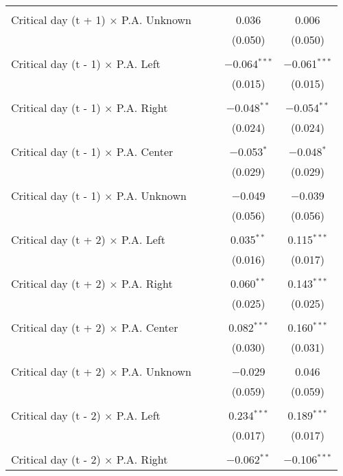 \documentclass[
]{article}
\begin{document}
\begin{table}[!htbp]
{\begin{tabular}{@{\extracolsep{5pt}}lcccc}
  & & & & \\ 
 Critical day (t + 1) $\times$ P.A. Unknown &  &  & 0.036 & 0.006 \\ 
  &  &  & (0.050) & (0.050) \\ 
  & & & & \\ 
 Critical day (t - 1) $\times$ P.A. Left &  &  & $-$0.064$^{***}$ & $-$0.061$^{***}$ \\ 
  &  &  & (0.015) & (0.015) \\ 
  & & & & \\ 
 Critical day (t - 1) $\times$ P.A. Right &  &  & $-$0.048$^{**}$ & $-$0.054$^{**}$ \\ 
  &  &  & (0.024) & (0.024) \\ 
  & & & & \\ 
 Critical day (t - 1) $\times$ P.A. Center &  &  & $-$0.053$^{*}$ & $-$0.048$^{*}$ \\ 
  &  &  & (0.029) & (0.029) \\ 
  & & & & \\ 
 Critical day (t - 1) $\times$ P.A. Unknown &  &  & $-$0.049 & $-$0.039 \\ 
  &  &  & (0.056) & (0.056) \\ 
  & & & & \\ 
 Critical day (t + 2) $\times$ P.A. Left &  &  & 0.035$^{**}$ & 0.115$^{***}$ \\ 
  &  &  & (0.016) & (0.017) \\ 
  & & & & \\ 
 Critical day (t + 2) $\times$ P.A. Right &  &  & 0.060$^{**}$ & 0.143$^{***}$ \\ 
  &  &  & (0.025) & (0.025) \\ 
  & & & & \\ 
 Critical day (t + 2) $\times$ P.A. Center &  &  & 0.082$^{***}$ & 0.160$^{***}$ \\ 
  &  &  & (0.030) & (0.031) \\ 
  & & & & \\ 
 Critical day (t + 2) $\times$ P.A. Unknown &  &  & $-$0.029 & 0.046 \\ 
  &  &  & (0.059) & (0.059) \\ 
  & & & & \\ 
 Critical day (t - 2) $\times$ P.A. Left &  &  & 0.234$^{***}$ & 0.189$^{***}$ \\ 
  &  &  & (0.017) & (0.017) \\ 
  & & & & \\ 
 Critical day (t - 2) $\times$ P.A. Right &  &  & $-$0.062$^{**}$ & $-$0.106$^{***}$ \\ 

\end{tabular}}
\end{table}
\end{document}
